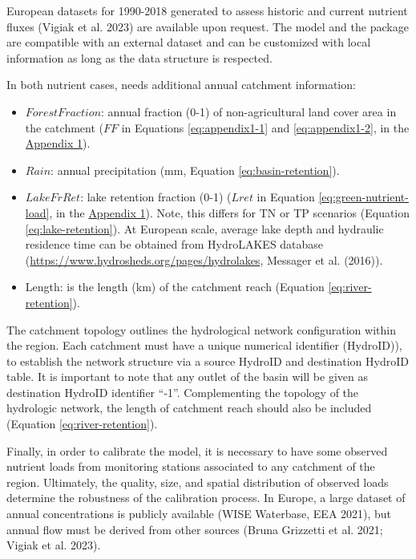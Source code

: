 \noindent European datasets for 1990-2018 generated to assess historic and current nutrient fluxes (Vigiak et al. 2023) are available upon request. The model and the package are compatible with an external dataset and can be customized with local information as long as the data structure is respected.

In both nutrient cases,  needs additional annual catchment information:

\begin{itemize}
\item
  \(ForestFraction\): annual fraction (0-1) of non-agricultural land cover area in the catchment (\(FF\) in Equations \eqref{eq:appendix1-1} and \eqref{eq:appendix1-2}, in the \protect\hyperlink{appendix-1}{Appendix 1}).
\item
  \(Rain\): annual precipitation (mm, Equation \eqref{eq:basin-retention}).
\item
  \(LakeFrRet\): lake retention fraction (0-1) (\(Lret\) in Equation \eqref{eq:green-nutrient-load}, in the \protect\hyperlink{appendix-1}{Appendix 1}). Note, this differs for TN or TP scenarios (Equation \eqref{eq:lake-retention}). At European scale, average lake depth and hydraulic residence time can be obtained from HydroLAKES database (\url{https://www.hydrosheds.org/pages/hydrolakes}, Messager et al. (2016)).
\item
  Length: is the length (km) of the catchment reach (Equation \eqref{eq:river-retention}).
\end{itemize}

\noindent The catchment topology outlines the hydrological network configuration within the region. Each catchment must have a unique numerical identifier (HydroID)), to establish the network structure via a source HydroID and destination HydroID table. It is important to note that any outlet of the basin will be given as destination HydroID identifier ``-1''. Complementing the topology of the hydrologic network, the length of catchment reach should also be included (Equation \eqref{eq:river-retention}).

Finally, in order to calibrate the model, it is necessary to have some observed nutrient loads from monitoring stations associated to any catchment of the region. Ultimately, the quality, size, and spatial distribution of observed loads determine the robustness of the calibration process. In Europe, a large dataset of annual concentrations is publicly available (WISE Waterbase, EEA 2021), but annual flow must be derived from other sources (Bruna Grizzetti et al. 2021; Vigiak et al. 2023).

